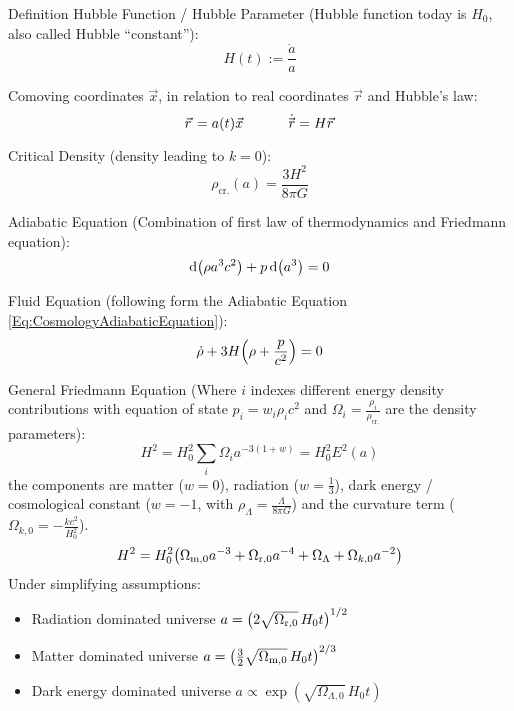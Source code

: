 		\noindent
		Definition Hubble Function / Hubble Parameter{} (Hubble function today is $H_0$, also called Hubble ``constant''):
		\begin{equation}
			H(t) := \frac{\dot{a}}{a}
		\end{equation}

		\noindent
		Comoving coordinates $\vec{x}$, in relation to real coordinates $\vec{r}$ and Hubble's law:
		\begin{equation}
			\vec{r} = a(t) \vec{x}
			\hsp
			\dot{\vec{r}} = H \vec{r}
		\end{equation}

		\noindent
		Critical Density (\ie density leading to $k=0$):
		\begin{equation}
			\rho_\text{cr.} (a) = \frac{3 H^2}{8 \pi G}
		\end{equation}

		\noindent
		Adiabatic Equation (Combination of first law of thermodynamics and Friedmann equation):
		\begin{equation}
			\label{Eq:CosmologyAdiabaticEquation}
			\dd \qty(\rho a^3 c^2) + p \dd (a^3) = 0
		\end{equation}

		\noindent
		Fluid Equation (following form the Adiabatic Equation \ref{Eq:CosmologyAdiabaticEquation}):
		\begin{equation}
			\dot{\rho} + 3 H \qty(\rho + \frac{p}{c^2}) = 0
		\end{equation}

		\noindent
		General Friedmann Equation (Where $i$ indexes different energy density contributions with equation of state $p_i = w_i \rho_i c^2$ and $\Omega_i = \frac{\rho_i}{\rho_\text{cr.}}$ are the density parameters):
		\begin{equation}
			H^2 = H_0^2\sum_i \Omega_i a^{-3(1+w)} = H_0^2 E^2(a)
		\end{equation}
		the components are matter ($w=0$), radiation ($w=\frac{1}{3}$), dark energy / cosmological constant ($w=-1$, with $\rho_\Lambda = \frac{\Lambda}{8\pi G}$) and the curvature term ($\Omega_{k,0}=-\frac{k c^2}{H_0^2}$).
		\begin{equation}
			H^2 = H_0^2 \qty(\Omega_{\text{m},0} a^{-3} + \Omega_{\text{r},0} a^{-4} + \Omega_{\Lambda} + \Omega_{k,0} a^{-2})
		\end{equation}
		Under simplifying assumptions:
		\begin{itemize}
			\item Radiation dominated universe $a = \qty(2\sqrt{\Omega_{\text{r},0}} \, H_0 t)^{1/2}$
			\item Matter dominated universe $a = \qty(\frac{3}{2}\sqrt{\Omega_{\text{m},0}} \, H_0 t)^{2/3}$
			\item Dark energy dominated universe $a \propto \exp(\sqrt{\Omega_{\Lambda,0}} \, H_0 t)$
		\end{itemize}

